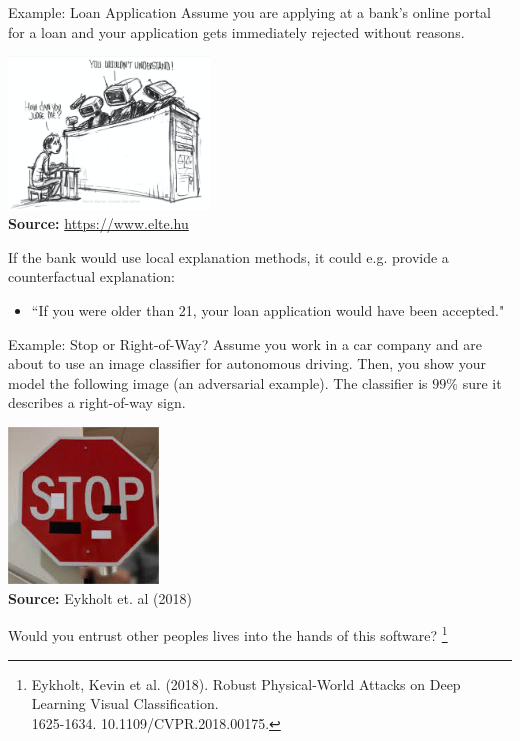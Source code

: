 \documentclass[11pt,compress,t,notes=noshow, xcolor=table]{beamer}
\begin{document}
\begin{vbframe}{Example: Loan Application}
Assume you are applying at a bank's online portal for a loan and your application gets immediately rejected without reasons.
	\begin{center}
		\includegraphics[width=0.4\textwidth]{figure/IntroJudge.png}\\
		{\tiny \textbf{Source:} \href{https://www.elte.hu/content/trendfordulo-az-mi-fejlesztesekben.t.19025}{https://www.elte.hu}}
	\end{center}
	If the bank would use local explanation methods, it could e.g. provide a counterfactual explanation:
	\begin{itemize}
	    \item[] ``If you were older than 21, your loan application would have been accepted."
	\end{itemize}
\end{vbframe}

\begin{vbframe}{Example: Stop or Right-of-Way?}
Assume you work in a car company and are about to use an image classifier for autonomous driving. Then, you show your model the following image (an adversarial example). The classifier is $99\%$ sure it describes a right-of-way sign.
	\begin{center}
		\includegraphics[width=0.3\textwidth]{figure/IntroStop.jpg}\\
		{\tiny \textbf{Source:} Eykholt et. al (2018)}
	\end{center}
	Would you entrust other peoples lives into the hands of this software?
	\footnote[frame]{Eykholt, Kevin et al. (2018). Robust Physical-World Attacks on Deep Learning Visual Classification. \\1625-1634. 10.1109/CVPR.2018.00175.}
\end{vbframe}
\end{document}
